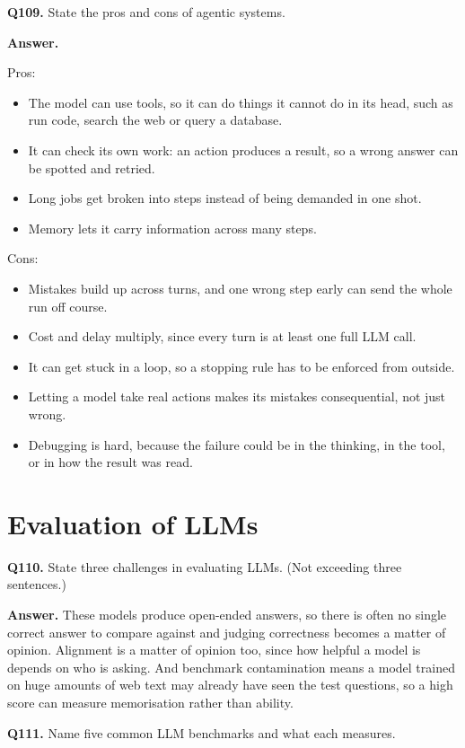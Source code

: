 \documentclass[11pt]{article}
\begin{document}
\medskip
\textbf{Q109.} State the pros and cons of agentic systems.

\textbf{Answer.}

Pros:
\begin{itemize}
  \item The model can use tools, so it can do things it cannot do in its head, such as run code, search the web or query a database.
  \item It can check its own work: an action produces a result, so a wrong answer can be spotted and retried.
  \item Long jobs get broken into steps instead of being demanded in one shot.
  \item Memory lets it carry information across many steps.
\end{itemize}

Cons:
\begin{itemize}
  \item Mistakes build up across turns, and one wrong step early can send the whole run off course.
  \item Cost and delay multiply, since every turn is at least one full LLM call.
  \item It can get stuck in a loop, so a stopping rule has to be enforced from outside.
  \item Letting a model take real actions makes its mistakes consequential, not just wrong.
  \item Debugging is hard, because the failure could be in the thinking, in the tool, or in how the result was read.
\end{itemize}

\section{Evaluation of LLMs}

\textbf{Q110.} State three challenges in evaluating LLMs. (Not exceeding three sentences.)

\textbf{Answer.} These models produce open-ended answers, so there is often no single correct
answer to compare against and judging correctness becomes a matter of opinion. Alignment is a
matter of opinion too, since how helpful a model is depends on who is asking. And benchmark
contamination means a model trained on huge amounts of web text may already have seen the test
questions, so a high score can measure memorisation rather than ability.

\medskip
\textbf{Q111.} Name five common LLM benchmarks and what each measures.
\end{document}
